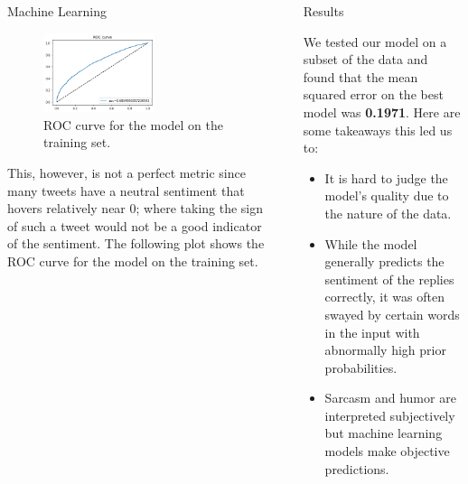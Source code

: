 \documentclass[final]{beamer}
\newlength{\sepwidth}
\newlength{\colwidth}
\newcommand{\separatorcolumn}{\begin{column}{\sepwidth}\end{column}}
\begin{document}
\begin{frame}[t]
\begin{columns}[t]
\begin{column}{\colwidth}
\begin{block}{Machine Learning}
    \begin{figure}[h]
      \centering
      \includegraphics[width=0.6\textwidth]{auroc.png}
      \caption{ROC curve for the model on the training set.}
    \end{figure}

    This, however, is not a perfect metric since many tweets have a neutral sentiment that hovers relatively near 0; where taking the sign of such a tweet would not be a good indicator of the sentiment. The following plot shows the ROC curve for the model on the training set.

  \end{block}

\end{column}

\separatorcolumn

\begin{column}{\colwidth}

  \begin{alertblock}{Results}

    We tested our model on a subset of the data and found that the mean squared error on the best model was \textbf{0.1971}. Here are some takeaways this led us to:

    \begin{itemize}
      \item It is hard to judge the model's quality due to the nature of the data.
      \item While the model generally predicts the sentiment of the replies correctly, it was often swayed by certain words in the input with abnormally high prior probabilities.
      \item Sarcasm and humor are interpreted subjectively but machine learning models make objective predictions.
    \end{itemize}

    


  \end{alertblock}


\end{column}
\end{columns}
\end{frame}
\end{document}
